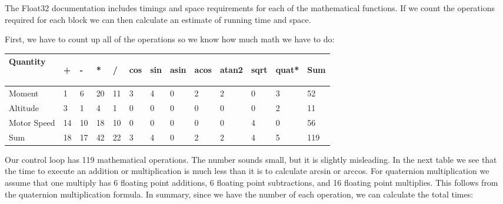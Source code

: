 \documentclass{article}
\numberwithin{equation}{section} %
\begin{document}
The Float32 documentation includes timings and space requirements for each of the mathematical functions. If we count the operations required for each block we can then calculate an estimate of running time and space.

First, we have to count up all of the operations so we know how much math we have to do:


\begin{longtable}{l l l l l l l l l l l l l}
Quantity&	
\begin{sideways}+\end{sideways}	&	
\begin{sideways}-\end{sideways}	&	
\begin{sideways}*\end{sideways}	&	
\begin{sideways}/\end{sideways}	&	
\begin{sideways}cos\end{sideways}	&	
\begin{sideways}sin\end{sideways}	&	
\begin{sideways}asin\end{sideways}	&	
\begin{sideways}acos\end{sideways}	&	
\begin{sideways}atan2\end{sideways}	&	
\begin{sideways}sqrt\end{sideways}	&	
\begin{sideways}quat*\end{sideways}	&	
\begin{sideways}Sum\end{sideways}\\
	\hline
Moment	&	1	&	6	&	20	&	11	&	3	&	4	&	0	&	2	&	2	&	0	&	3	&	52 \\
	\hline
Altitude &	3	&	1	&	4	&	1	&	0	&	0	&	0	&	0	&	0	&	0	&	2	&	11	 \\
	\hline
Motor Speed	&	14	&	10	&	18	&	10	&	0	&	0	&	0	&	0	&	0	&	4	&	0	&	56		 \\
	\hline
	Sum	&	18	&	17	&	42	&	22	&	3	&	4	&	0	&	2	&	2	&	4	&	5	&	119	\\
\end{longtable}

Our control loop has 119 mathematical operations. The number sounds small, but it is slightly misleading. In the next table we see that the time to execute an addition or multiplication is much less than it is to calculate arcsin or arccos. For quaternion multiplication we assume that one multiply has 6 floating point additions, 6 floating point subtractions, and 16 floating point multiplies. This follows from the quaternion multiplication formula. In summary, since we have the number of each operation, we can calculate the total times:
\end{document}
